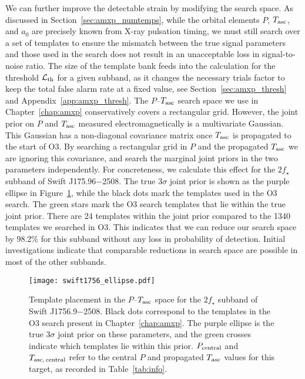 We can further improve the detectable strain by modifying the search space. As discussed in Section~\ref{sec:amxp_numtemps}, while the orbital elements $P$, $T_{\textrm{asc}}$, and $a_0$ are precisely known from X-ray pulsation timing, we must still search over a set of templates to ensure the mismatch between the true signal parameters and those used in the search does not result in an unacceptable loss in signal-to-noise ratio. The size of the template bank feeds into the calculation for the threshold $\mathcal{L}_{\rm th}$ for a given subband, as it changes the necessary trials factor to keep the total false alarm rate at a fixed value, see Section~\ref{sec:amxp_thresh} and Appendix~\ref{app:amxp_thresh}. The $P$--$T_{\textrm{asc}}$ search space we use in Chapter~\ref{chap:amxp} conservatively covers a rectangular grid. However, the joint prior on $P$ and $T_{\textrm{asc}}$ measured electromagnetically is a multivariate Gaussian. This Gaussian has a non-diagonal covariance matrix once $T_{\textrm{asc}}$ is propagated to the start of O3. By searching a rectangular grid in $P$ and the propagated $T_{\textrm{asc}}$ we are ignoring this covariance, and search the marginal joint priors in the two parameters independently. For concreteness, we calculate this effect for the $2f_\star$ subband of Swift J175.96$-$2508. The true $3\sigma$ joint prior is shown as the purple ellipse in Figure~\ref{fig:grid_ellipse}, while the black dots mark the templates used in the O3 search. The green stars mark the O3 search templates that lie within the true joint prior. There are 24 templates within the joint prior compared to the 1340 templates we searched in O3. This indicates that we can reduce our search space by 98.2\% for this subband without any loss in probability of detection. Initial investigations indicate that comparable reductions in search space are possible in most of the other subbands. 

\begin{figure}
    \centering
    \texttt{[image: swift1756\_ellipse.pdf]}
    \caption{Template placement in the $P$--$T_{\textrm{asc}}$ space for the $2f_\star$ subband of Swift J1756.9$-$2508. Black dots correspond to the templates in the O3 search present in Chapter~\ref{chap:amxp}. The purple ellipse is the true $3\sigma$ joint prior on these parameters, and the green crosses indicate which templates lie within this prior. $P_{\rm central}$ and $T_{\rm asc,\,central}$ refer to the central $P$ and propagated $T_{\textrm{asc}}$ values for this target, as recorded in Table~\ref{tab:info}.}
    \label{fig:grid_ellipse}
\end{figure}

